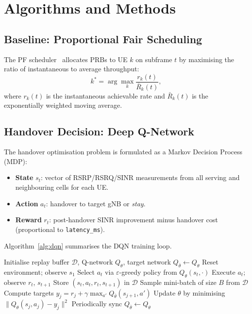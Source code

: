 \section{Algorithms and Methods}
\label{sec:algorithms}

\subsection{Baseline: Proportional Fair Scheduling}
The PF scheduler~\cite{prop_fair_sched} allocates PRBs to UE $k$ on
subframe $t$ by maximising the ratio of instantaneous to average
throughput:
\begin{equation}
  k^{*} = \arg\max_{k} \frac{r_k(t)}{\bar{R}_k(t)},
  \label{eq:pf}
\end{equation}
where $r_k(t)$ is the instantaneous achievable rate and $\bar{R}_k(t)$
is the exponentially weighted moving average.

\subsection{Handover Decision: Deep Q-Network}
The handover optimisation problem is formulated as a Markov Decision
Process (MDP):
\begin{itemize}
  \item \textbf{State} $s_t$: vector of RSRP/RSRQ/SINR measurements from
        all serving and neighbouring cells for each UE.
  \item \textbf{Action} $a_t$: handover to target gNB or \emph{stay}.
  \item \textbf{Reward} $r_t$: post-handover SINR improvement minus
        handover cost (proportional to \texttt{latency\_ms}).
\end{itemize}

Algorithm~\ref{alg:dqn} summarises the DQN training loop.

\begin{algorithm}
\caption{DQN Handover Optimisation}
\label{alg:dqn}
\begin{algorithmic}[1]
\STATE Initialise replay buffer $\mathcal{D}$, Q-network $Q_\theta$,
       target network $Q_{\bar\theta} \leftarrow Q_\theta$
  \STATE Reset environment; observe $s_1$
    \STATE Select $a_t$ via $\varepsilon$-greedy policy from $Q_\theta(s_t,\cdot)$
    \STATE Execute $a_t$; observe $r_t$, $s_{t+1}$
    \STATE Store $(s_t, a_t, r_t, s_{t+1})$ in $\mathcal{D}$
      \STATE Sample mini-batch of size $B$ from $\mathcal{D}$
      \STATE Compute targets $y_j = r_j + \gamma \max_{a'} Q_{\bar\theta}(s_{j+1}, a')$
      \STATE Update $\theta$ by minimising $\|Q_\theta(s_j,a_j) - y_j\|^2$
      \STATE Periodically sync $Q_{\bar\theta} \leftarrow Q_\theta$
    \ENDIF
  \ENDFOR
\ENDFOR
\end{algorithmic}
\end{algorithm}

